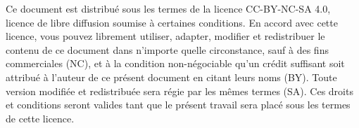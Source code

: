 Ce document est distribu\'{e} sous les termes de la licence CC-BY-NC-SA 4.0, licence de libre diffusion soumise à certaines conditions. En accord avec cette licence, vous pouvez librement utiliser, adapter, modifier et redistribuer le contenu de ce document dans n'importe quelle circonstance, sauf à des fins commerciales (NC), et à la condition non-n\'{e}gociable qu’un cr\'{e}dit suffisant soit attribu\'{e} à l'auteur de ce pr\'{e}sent document en citant leurs noms (BY). Toute version modifi\'{e}e et redistribu\'{e}e sera r\'{e}gie par les m\^{e}mes termes (SA). Ces droits et conditions seront valides tant que le pr\'{e}sent travail sera plac\'{e} sous les termes de cette licence.
%
